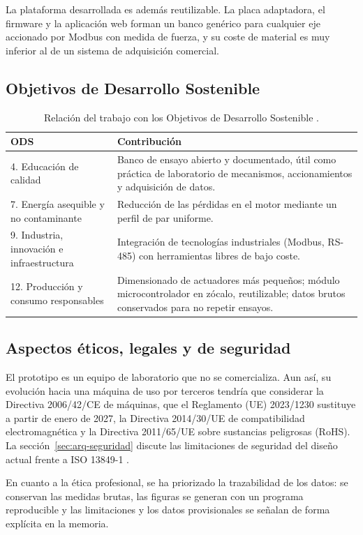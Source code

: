 La plataforma desarrollada es además reutilizable. La placa adaptadora, el firmware y la aplicación
web forman un banco genérico para cualquier eje accionado por Modbus con medida de fuerza, y su
coste de material es muy inferior al de un sistema de adquisición comercial.

\subsection{Objetivos de Desarrollo Sostenible}

\begin{table}[H]
\centering
\caption{Relación del trabajo con los Objetivos de Desarrollo Sostenible \cite{agenda2030}.}
\label{tab:ods}
\begin{tabularx}{\textwidth}{@{}lX@{}}
\toprule
ODS & Contribución \\
\midrule
4. Educación de calidad & Banco de ensayo abierto y documentado, útil como práctica de laboratorio de mecanismos, accionamientos y adquisición de datos. \\
7. Energía asequible y no contaminante & Reducción de las pérdidas en el motor mediante un perfil de par uniforme. \\
9. Industria, innovación e infraestructura & Integración de tecnologías industriales (Modbus, RS-485) con herramientas libres de bajo coste. \\
12. Producción y consumo responsables & Dimensionado de actuadores más pequeños; módulo microcontrolador en zócalo, reutilizable; datos brutos conservados para no repetir ensayos. \\
\bottomrule
\end{tabularx}
\end{table}

\subsection{Aspectos éticos, legales y de seguridad}

El prototipo es un equipo de laboratorio que no se comercializa. Aun así, su evolución hacia una
máquina de uso por terceros tendría que considerar la Directiva 2006/42/CE de máquinas, que el
Reglamento (UE) 2023/1230 sustituye a partir de enero de 2027, la Directiva 2014/30/UE de
compatibilidad electromagnética y la Directiva 2011/65/UE sobre sustancias peligrosas (RoHS). La
sección~\ref{sec:arq-seguridad} discute las limitaciones de seguridad del diseño actual frente a
ISO 13849-1 \cite{iso13849}.

En cuanto a la ética profesional, se ha priorizado la trazabilidad de los datos: se conservan las
medidas brutas, las figuras se generan con un programa reproducible y las limitaciones y los datos
provisionales se señalan de forma explícita en la memoria.
